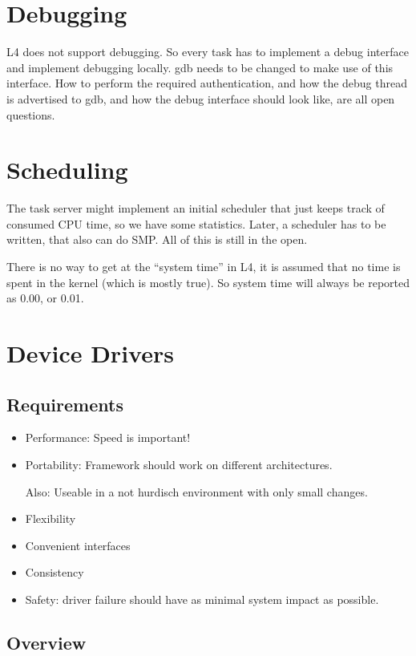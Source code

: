 \documentclass[9pt,a4paper]{extarticle}
\begin{document}
\section{Debugging}

L4 does not support debugging.  So every task has to implement a debug
interface and implement debugging locally.  gdb needs to be changed to
make use of this interface.  How to perform the required
authentication, and how the debug thread is advertised to gdb, and how
the debug interface should look like, are all open questions.


\section{Scheduling}

The task server might implement an initial scheduler that just keeps
track of consumed CPU time, so we have some statistics.  Later, a
scheduler has to be written, that also can do SMP.  All of this is
still in the open.

There is no way to get at the ``system time'' in L4, it is assumed
that no time is spent in the kernel (which is mostly true).  So system
time will always be reported as 0.00, or 0.01.

\section{Device Drivers}

\subsection{Requirements}

  \begin{itemize}
  \item Performance: Speed is important!
  \item Portability: Framework should work on different architectures.
    
    Also: Useable in a not hurdisch environment with only
    small changes.

  \item Flexibility
  \item Convenient interfaces
  \item Consistency 
  \item Safety: driver failure should have as minimal system impact as
    possible.
  \end{itemize}

\subsection{Overview}
\end{document}
